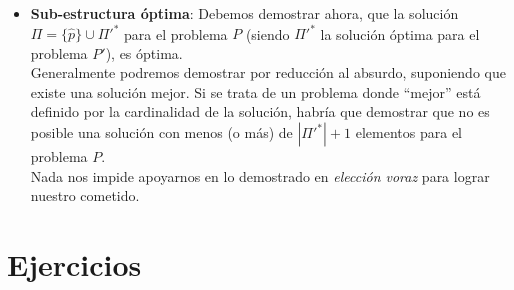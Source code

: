 \documentclass[spanish, fleqn]{article}
\begin{document}
\begin{itemize}
\item \textbf{Sub-estructura óptima}: Debemos demostrar ahora, que la solución $\Pi= \{\hat{p}\} \cup {\Pi'}^*$ para el problema $P$ (siendo ${\Pi'}^*$ la solución óptima para el problema $P'$), es óptima.
\\ Generalmente podremos demostrar por reducción al absurdo, suponiendo que existe una solución mejor. Si se trata de un problema donde ``mejor'' está definido por la cardinalidad de la solución, habría que demostrar que no es posible una solución con menos (o más) de $|{\Pi'}^*|+1$ elementos para el problema $P$.
\\ Nada nos impide apoyarnos en lo demostrado en \emph{elección voraz} para lograr nuestro cometido.
\end{itemize}

\section{Ejercicios}
\end{document}
